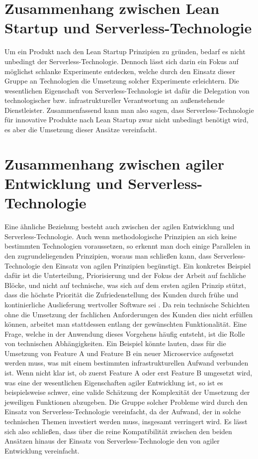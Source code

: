 \section{Zusammenhang zwischen Lean Startup und Serverless-Technologie}
\label{sec:leansl}
Um ein Produkt nach den Lean Startup Prinzipien zu gründen, bedarf es nicht unbedingt der Serverless-Technologie. Dennoch lässt sich darin ein Fokus auf möglichst schlanke Experimente entdecken, welche durch den Einsatz dieser Gruppe an Technologien die Umsetzung solcher Experimente erleichtern. Die wesentlichen Eigenschaft von Serverless-Technologie ist dafür die Delegation von technologischer bzw. infrastruktureller Verantwortung an außenstehende Dienstleister. Zusammenfassend kann man also sagen, dass Serverless-Technologie für innovative Produkte nach Lean Startup zwar nicht unbedingt benötigt wird, es aber die Umsetzung dieser Ansätze vereinfacht.

\section{Zusammenhang zwischen agiler Entwicklung und Serverless-Technologie}
\label{sec:agilesl}
Eine ähnliche Beziehung besteht auch zwischen der agilen Entwicklung und Serverless-Technologie. Auch wenn methodologische Prinzipien an sich keine bestimmten Technologien voraussetzen, so erkennt man doch einige Parallelen in den zugrundeliegenden Prinzipien, woraus man schließen kann, dass Serverless-Technologie den Einsatz von agilen Prinzipien begünstigt. Ein konkretes Beispiel dafür ist die Unterteilung, Priorisierung und der Fokus der Arbeit auf fachliche Blöcke, und nicht auf technische, was sich auf dem ersten agilen Prinzip stützt, dass die höchste Priorität die Zufriedenstellung des Kunden durch frühe und kontinierliche Auslieferung wertvoller Software sei \cite{beck2001}. Da rein technische Schichten ohne die Umsetzung der fachlichen Anforderungen des Kunden dies nicht erfüllen können, arbeitet man stattdessen entlang der gewünschten Funktionalität. Eine Frage, welche in der Anwendung dieses Vorgehens häufig entsteht, ist die Rolle von technischen Abhängigkeiten. Ein Beispiel könnte lauten, dass für die Umsetzung von Feature A und Feature B ein neuer Microservice aufgesetzt werden muss, was mit einem bestimmten infrastrukturellen Aufwand verbunden ist. Wenn nicht klar ist, ob zuerst Feature A oder erst Feature B umgesetzt wird, was eine der wesentlichen Eigenschaften agiler Entwicklung ist, so ist es beispielsweise schwer, eine valide Schätzung der Komplexität der Umsetzung der jeweiligen Funktionen abzugeben. Die Gruppe solcher Probleme wird durch den Einsatz von Serverless-Technologie vereinfacht, da der Aufwand, der in solche technischen Themen investiert werden muss, insgesamt verringert wird. Es lässt sich also schließen, dass über die reine Kompatibilität zwischen den beiden Ansätzen hinaus der Einsatz von Serverless-Technologie den von agiler Entwicklung vereinfacht.

